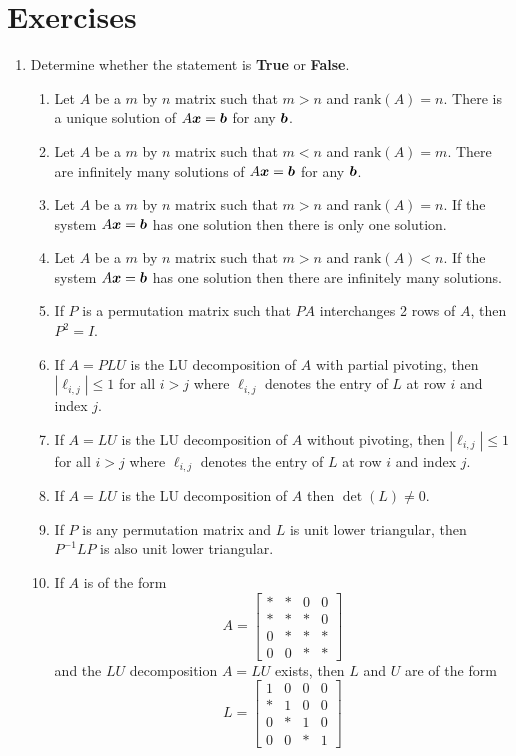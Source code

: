 \section{Exercises}

\begin{enumerate}[leftmargin=*]
\item Determine whether the statement is {\bf True} or {\bf False}.
\begin{enumerate}
\item Let $A$ be a $m$ by $n$ matrix such that $m > n$ and $\mathrm{rank}(A) = n$. There is a unique solution of $A \boldsymbol{x} = \boldsymbol{b}$ for any $\boldsymbol{b}$.
\item Let $A$ be a $m$ by $n$ matrix such that $m < n$ and $\mathrm{rank}(A) = m$. There are infinitely many solutions of $A \boldsymbol{x} = \boldsymbol{b}$ for any $\boldsymbol{b}$.
\item Let $A$ be a $m$ by $n$ matrix such that $m > n$ and $\mathrm{rank}(A) = n$. If the system $A \boldsymbol{x} = \boldsymbol{b}$ has one solution then there is only one solution.
\item Let $A$ be a $m$ by $n$ matrix such that $m > n$ and $\mathrm{rank}(A) < n$. If the system $A \boldsymbol{x} = \boldsymbol{b}$ has one solution then there are infinitely many solutions.
\item If $P$ is a permutation matrix such that $PA$ interchanges 2 rows of $A$, then $P^2 = I$.
\item If $A = PLU$ is the LU decomposition of $A$ with partial pivoting, then $| \ell_{i,j} | \leq 1$ for all $i > j$ where $\ell_{i,j}$ denotes the entry of $L$ at row $i$ and index $j$.
\item If $A = LU$ is the LU decomposition of $A$ without pivoting, then $| \ell_{i,j} | \leq 1$ for all $i > j$ where $\ell_{i,j}$ denotes the entry of $L$ at row $i$ and index $j$.
\item If $A = LU$ is the LU decomposition of $A$ then $\det(L) \not= 0$.
\item If $P$ is any permutation matrix and $L$ is unit lower triangular, then $P^{-1} L P$ is also unit lower triangular.
\item If $A$ is of the form
$$
A = \begin{bmatrix} * & * & 0 & 0 \\ * & * & * & 0 \\ 0 & * & * & * \\ 0 & 0 & * & * \end{bmatrix}
$$
and the $LU$ decomposition $A = LU$ exists, then $L$ and $U$ are of the form
$$
L = \begin{bmatrix} 1 & 0 & 0 & 0 \\ * & 1 & 0 & 0 \\ 0 & * & 1 & 0 \\ 0 & 0 & * & 1 \end{bmatrix}
$$
\end{enumerate}
\end{enumerate}
